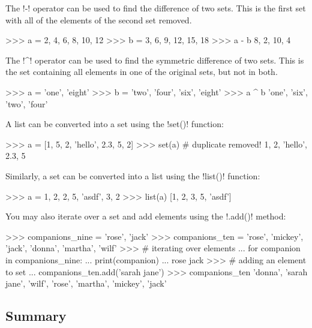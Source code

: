 \documentclass[11pt]{cselabheader}
\begin{document}
The \pythoninline!-! operator can be used to find the difference of two sets.
This is the first set with all of the elements of the second set removed.
\begin{pyconcode}
>>> a = {2, 4, 6, 8, 10, 12}
>>> b = {3, 6, 9, 12, 15, 18}
>>> a - b
{8, 2, 10, 4}
\end{pyconcode}

The \pythoninline!^! operator can be used to find the symmetric difference
of two sets. This is the set containing all elements in one of the original
sets, but not in both.
\begin{pyconcode}
>>> a = {'one', 'eight'}
>>> b = {'two', 'four', 'six', 'eight'}
>>> a ^ b
{'one', 'six', 'two', 'four'}
\end{pyconcode}

A list can be converted into a set using the \pythoninline!set()! function:
\begin{pyconcode}
>>> a = [1, 5, 2, 'hello', 2.3, 5, 2]
>>> set(a) # duplicate removed!
{1, 2, 'hello', 2.3, 5}
\end{pyconcode}

Similarly, a set can be converted into a list using the \pythoninline!list()!
function:
\begin{pyconcode}
>>> a = {1, 2, 2, 5, 'asdf', 3, 2}
>>> list(a)
[1, 2, 3, 5, 'asdf']
\end{pyconcode}

You may also iterate over a set and add elements using the
\pythoninline!.add()! method:
\begin{pyconcode}
>>> companions_nine = {'rose', 'jack'}
>>> companions_ten = {'rose', 'mickey', 'jack', 'donna', 'martha', 'wilf'}
>>> # iterating over elements
... for companion in companions_nine:
...     print(companion)
...
rose
jack
>>> # adding an element to set
... companions_ten.add('sarah jane')
>>> companions_ten
{'donna', 'sarah jane', 'wilf', 'rose', 'martha', 'mickey', 'jack'}
\end{pyconcode}

\pagebreak
\subsection{Summary}
\end{document}
